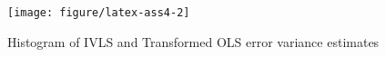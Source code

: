 \documentclass{article}\usepackage{graphicx, color}
\makeatletter
\def\maxwidth{ %
  \ifdim\Gin@nat@width>\linewidth
    \linewidth
  \else
    \Gin@nat@width
  \fi
}
\newenvironment{knitrout}{}{} %
\makeatother
\begin{document}
\begin{knitrout}
\color{fgcolor}\begin{figure}[]


{\centering \texttt{[image: figure/latex-ass4-2]} 

}

\caption[Histogram of IVLS and Transformed OLS error variance estimates]{Histogram of IVLS and Transformed OLS error variance estimates\label{fig:ass4-2}}
\end{figure}


\end{knitrout}
\end{document}
